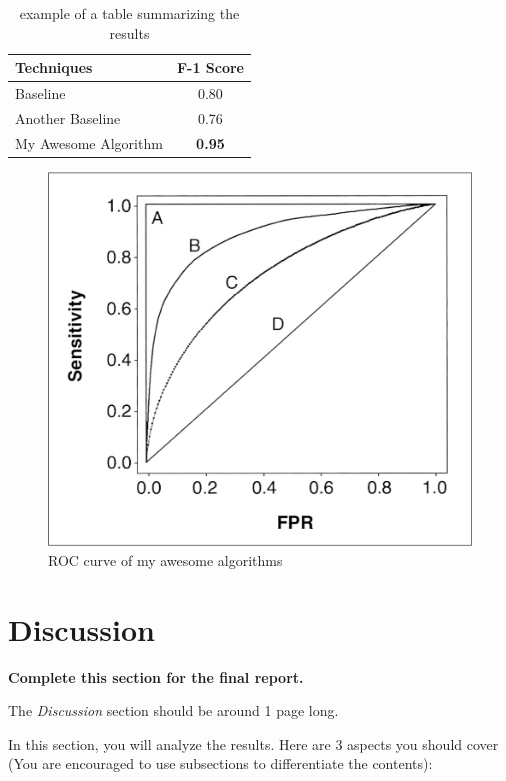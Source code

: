 \documentclass[letterpaper]{article} %
\begin{document}
\begin{table}[h!]
    \centering
    \normalsize{
    \begin{tabular}{ l c }
    \hline
         Techniques & F-1 Score\\
         \hline
          Baseline & 0.80 \\
          Another Baseline & 0.76\\
          My Awesome Algorithm & {\bf 0.95}\\
         \hline
    \end{tabular}}
    \caption{example of a table summarizing the results}
    \label{tab:results1}
\end{table} 

\begin{figure}[htbp!]
  \centering
  \includegraphics[width=0.9\linewidth]{figures/roc.png}
  \caption{ROC curve of my awesome algorithms}
  \label{fig:results2}
\end{figure}


\section{Discussion}

{\bf Complete this section for the final report.}

The {\em Discussion} section should be around 1 page long.

In this section, you will analyze the results. Here are 3 aspects you should cover (You are encouraged to use subsections to differentiate the contents):
\end{document}
